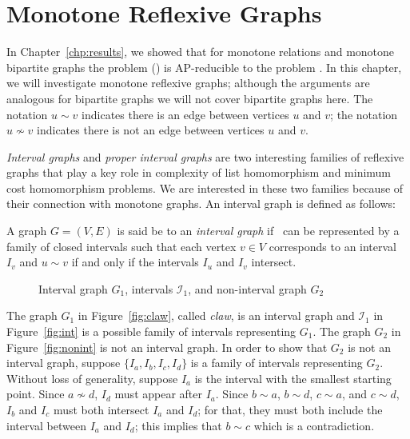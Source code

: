 \chapter{Monotone Reflexive Graphs}
In Chapter~\ref{chp:results}, we showed that for monotone relations and monotone
bipartite graphs the problem \ccsp(\mH) is AP-reducible to the problem \cbis\@. In this chapter,
we will investigate monotone reflexive graphs; although the arguments are
analogous for bipartite graphs we will not cover bipartite graphs here.
The notation \(u \sim v\) indicates there is an edge between vertices \(u\) and \(v\);
the notation \(u \not \sim v\) indicates there is not an edge between vertices \(u\) and \(v\)\@.

\emph{Interval graphs} and \emph{proper interval graphs}
are two interesting families of reflexive graphs that play a key role in complexity of 
list homomorphism and minimum cost homomorphism problems. We are interested in these two families
because of their connection with monotone graphs. 
An interval graph is defined as follows:

\begin{defi}
A graph \(G=(V,E)\) is said be to an \emph{interval graph} if \mG\ can
be represented by a family of closed intervals such that
each vertex \(v \in V\) corresponds to an interval \(I_v\) and \(u \sim v\)
if and only if the intervals \(I_u\) and \(I_v\) intersect.
\end{defi}

\begin{figure} [h]
\center
\subfigure[\ensuremath{G_1}]{\label{fig:claw}} \hspace{2cm}
\subfigure[\ensuremath{I_1}]{\label{fig:int}} \hspace{2cm}
\subfigure[\ensuremath{G_2}]{\label{fig:nonint}}
\caption{Interval graph \ensuremath{G_1}, intervals \ensuremath{\mathcal{I}_1}, and non-interval graph \ensuremath{G_2}}
\end{figure}

The graph \(G_1\) in Figure~\ref{fig:claw}, called \emph{claw}, is an interval graph
and \(\mathcal{I}_1\) in Figure~\ref{fig:int} is a possible family of intervals representing \(G_1\)\@.
The graph \(G_2\) in Figure~\ref{fig:nonint} is not an interval graph. In order to show that \(G_2\) is not
an interval graph, suppose \(\{I_a, I_b, I_c, I_d\}\) is a family of intervals representing \(G_2\)\@.
Without loss of generality, suppose \(I_a\) is the interval with the smallest starting point.
Since \(a\not \sim d\), \(I_d\) must appear after \(I_a\)\@. Since \(b\sim a\), \(b\sim d\), \(c\sim a\), and \(c\sim d\),
\(I_b\) and \(I_c\) must both intersect \(I_a\) and \(I_d\); for that, they must both include the interval between
\(I_a\) and \(I_d\); this implies that \(b\sim c\) which is a contradiction.

